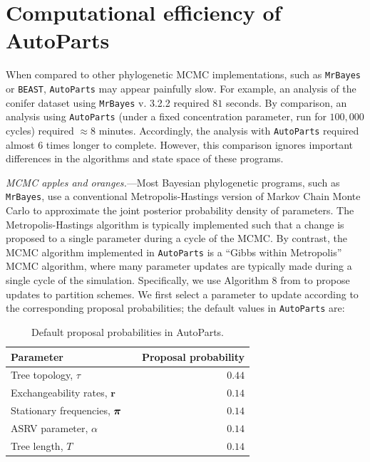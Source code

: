 \documentclass[11pt]{article}
\begin{document}
\section*{Computational efficiency of AutoParts}
When compared to other phylogenetic MCMC implementations, such as \verb!MrBayes! or \verb!BEAST!, \verb!AutoParts! may appear painfully slow.
For example, an analysis of the conifer dataset using \verb!MrBayes! v. 3.2.2 \citep[under a mixed model corresponding to the mean partition scheme, with a single chain run for $100,000$ cycles using the beagle library;][]{suchard09} required $81$ seconds.
By comparison, an analysis using \verb!AutoParts! (under a fixed concentration parameter, run for $100,000$ cycles) required $\approx 8$ minutes. 
Accordingly, the analysis with \verb!AutoParts! required almost $6$ times longer to complete.
However, this comparison ignores important differences in the algorithms and state space of these programs.

\bigskip
\emph{MCMC apples and oranges.}---Most Bayesian phylogenetic programs, such as \verb!MrBayes!, use a conventional Metropolis-Hastings version of Markov Chain Monte Carlo \citep[][]{metropolis53,hastings70} to approximate the joint posterior probability density of parameters.
The Metropolis-Hastings algorithm is typically implemented such that a change is proposed to a single parameter during a cycle of the MCMC.
By contrast, the MCMC algorithm implemented in \verb!AutoParts! is a ``Gibbs within Metropolis'' MCMC algorithm, where many parameter updates are typically made during a single cycle of the simulation.
Specifically, we use Algorithm $8$ from \citet{neal00} to propose updates to partition schemes.
We first select a parameter to update according to the corresponding proposal probabilities; the default values in \verb!AutoParts! are:

\begin{table}[h]
\centering
\caption{\small Default proposal probabilities in AutoParts.} 
\label{bftable}
\begin{tabular}{l l r}
\hline
\multicolumn{1}{l}{Parameter} & \multicolumn{1}{r}{ } &\multicolumn{1}{l}{{Proposal probability}} \\ 
\hline
Tree topology, $\tau$ 								&	&	$0.44$ \\
Exchangeability rates, ${\mathbf r}$ 							&	&	$0.14$ \\
Stationary frequencies, $\mbox{\boldmath$\pi$\unboldmath}$ 		&	&	$0.14$ \\
ASRV parameter, $\alpha$ 							&	&	$0.14$ \\
Tree length, $T$  								&	&	$0.14$ \\
\hline
\end{tabular}
\end{table}
\end{document}
